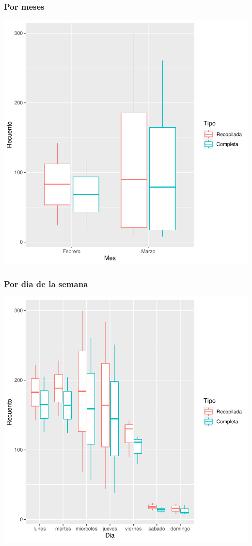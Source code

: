 \documentclass{article}
\begin{document}
\subsubsection{Por meses}

\includegraphics{seguimento2-025}

\subsubsection{Por dia de la semana}

\includegraphics{seguimento2-026}
\end{document}
